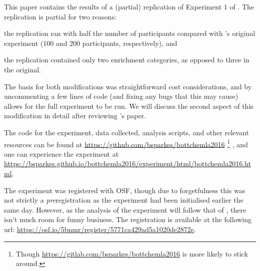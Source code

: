 \documentclass[10pt]{article}
\begin{document}
\begin{multicols}{2}
This paper contains the results of a (partial) replication of Experiment 1 of \textcite{Bott:2016aa}.
The replication is partial for two reasons:
\begin{enumerate*}[label=\arabic*)]
\item the replication ran with half the number of participants compared with \citeauthor{Bott:2016aa}'s original experiment (100 and 200 participants, respectively), and
\item the replication contained only two enrichment categories, as opposed to three in the original.
\end{enumerate*}
The basis for both modifications was straightforward cost considerations, and by uncommenting a few lines of code (and fixing any bugs that this may cause) allows for the full experiment to be run.
We will discuss the second aspect of this modification in detail after reviewing \citeauthor{Bott:2016aa}'s paper.

The code for the experiment, data collected, analysis scripts, and other relevant resources can be found at \url{https://github.com/bsparkes/bottchemla2016}\nolinebreak
\footnote{Though \url{https://gitlab.com/bsparkes/bottchemla2016} is more likely to stick around.}\nolinebreak
, and one can experience the experiment at \url{https://bsparkes.github.io/bottchemla2016/experiment/html/bottchemla2016.html}.






The experiment was registered with OSF, though due to forgetfulness this was not strictly a \emph{pre}registration as the experiment had been initialised earlier the same day.
However, as the analysis of the experiment will follow that of \citeauthor{Bott:2016aa}, there isn't much room for funny business.
The registration is available at the following url: \url{https://osf.io/5bnmr/register/5771ca429ad5a1020de2872e}.




\end{multicols}
\end{document}
